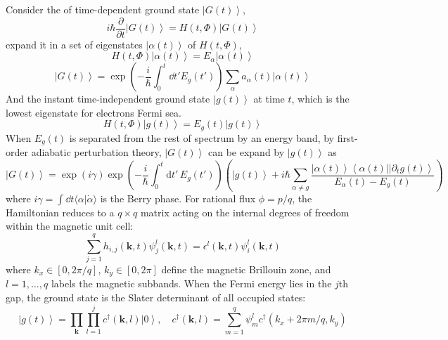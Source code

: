 \documentclass[12pt,a4paper]{article}
\newcommand{\bra}[1]{\left\langle{#1}\right|}
\newcommand{\ket}[1]{\left|{#1}\right\rangle}
\newcommand{\braket}[2]{\langle{#1}|{#2}\rangle}
\begin{document}
    Consider the of time-dependent ground state $\ket{G(t)}$,
    \[
        i\hbar \frac{\partial}{\partial t} \ket{G(t)} = H(t,\Phi) \ket{G(t)}
    \]
    expand it in a set of eigenstates $\ket{\alpha(t)}$ of $H(t,\Phi)$,
    \begin{equation}
    \label{eq:H_alpha}
        H(t,\Phi)\ket{\alpha(t)} = E_{\alpha}\ket{\alpha(t)}
    \end{equation}
    \[
        \ket{G(t)} = \exp\left(-\frac{i}{\hbar}\int_0^t \dd t' E_g(t')\right) \sum_{\alpha} a_{\alpha}(t) \ket{\alpha(t)}
    \]
    And the instant time-independent ground state $\ket{g(t)}$ at time $t$, which is the lowest eigenstate for electrons Fermi sea.
    \[
        H(t, \Phi) \ket{g(t)} = E_g(t) \ket{g(t)}
    \]
    When $E_g(t)$ is separated from the rest of spectrum by an energy band, by first-order adiabatic perturbation theory, $\ket{G(t)}$ can be expand by $\ket{g(t)}$ as
    \begin{equation}
        \ket{G(t)}
        = \exp\left(i\gamma\right) \exp\left(-\frac{i}{\hbar} \int_0^t \mathrm{d}t' \, E_g(t')\right)
        \left(\ket{g(t)} + i\hbar \sum_{\alpha \neq g} \frac{\ket{\alpha(t)} \bra{\alpha(t)} \ket{\partial_t g(t)}}{E_\alpha(t) - E_g(t)}
        \right)
    \end{equation}
    where $i\gamma=\int \dd t \braket{\alpha}{\dot{\alpha}}$ is the Berry phase. For rational flux $\phi = p/q$, the Hamiltonian reduces to a $q\times q$ matrix acting on the internal degrees of freedom within the magnetic unit cell:
    \begin{equation}
        \sum_{j=1}^{q} h_{i,j}(\mathbf{k},t) \psi_j^{l}(\mathbf{k},t)
        = \epsilon^{l}(\mathbf{k},t) \psi_i^{l}(\mathbf{k},t)
    \end{equation}
    where $k_x\in[0,2\pi/q]$, $k_y\in[0,2\pi]$ define the magnetic Brillouin zone, and $l=1,\dots,q$ labels the magnetic subbands. When the Fermi energy lies in the $j$th gap, the ground state is the Slater determinant of all occupied states:
    \begin{equation}
        \ket{g(t)} = \prod_{\mathbf{k}} \prod_{l=1}^{j} c^\dagger(\mathbf{k},l) \ket{0}, \quad
        c^\dagger(\mathbf{k},l) = \sum_{m=1}^{q} \psi_m^l c^\dagger(k_x+2\pi m/q, k_y)
    \end{equation}
\end{document}
